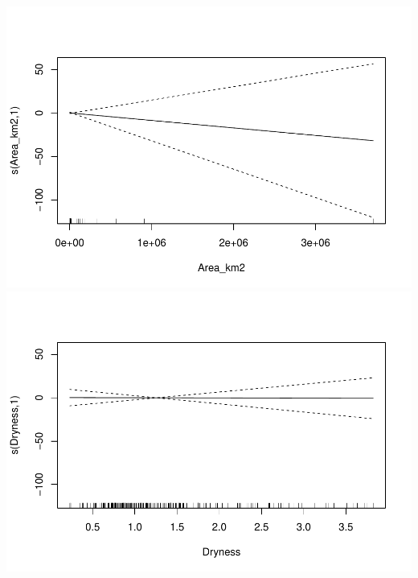 \documentclass[]{elsarticle} %
\begin{document}
\includegraphics{Forest_and_Water_files/figure-latex/model5-2.pdf}
\includegraphics{Forest_and_Water_files/figure-latex/model5-3.pdf}
\end{document}
